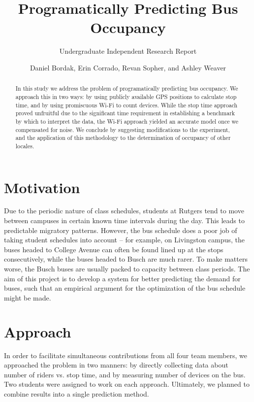 \documentclass[letterpaper,abstract=on,titlepage=false]{scrreprt}
\begin{document}
\title{Programatically Predicting Bus Occupancy}
\subtitle{Undergraduate Independent Research Report}
\author{Daniel Bordak, Erin Corrado, Revan Sopher, and Ashley Weaver}

\maketitle

\begin{abstract}
In this study we address the problem of programatically predicting bus occupancy.
We approach this in two ways: by using publicly available GPS positions to calculate stop time, and by using promiscuous Wi-Fi to count devices.
While the stop time approach proved unfruitful due to the significant time requirement in establishing a benchmark by which to interpret the data, the Wi-Fi approach yielded an accurate model once we compensated for noise.
We conclude by suggesting modifications to the experiment, and the application of this methodology to the determination of occupancy of other locales.
\end{abstract}

\section*{Motivation}

Due to the periodic nature of class schedules, students at Rutgers tend to move between campuses in certain known time intervals during the day.
This leads to predictable migratory patterns.
However, the bus schedule does a poor job of taking student schedules into account -- for example, on Livingston campus, the buses headed to College Avenue can often be found lined up at the stops consecutively, while the buses headed to Busch are much rarer.
To make matters worse, the Busch buses are usually packed to capacity between class periods.
The aim of this project is to develop a system for better predicting the demand for buses, such that an empirical argument for the optimization of the bus schedule might be made.

\section*{Approach}

In order to facilitate simultaneous contributions from all four team members, we approached the problem in two manners: by directly collecting data about number of riders vs. stop time, and by measuring number of devices on the bus.
Two students were assigned to work on each approach.
Ultimately, we planned to combine results into a single prediction method.
\end{document}
